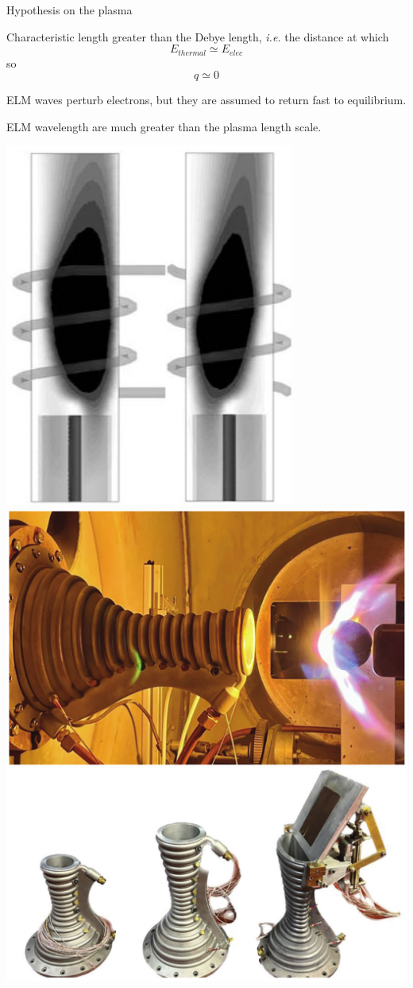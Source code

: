 \documentclass[24pt,t,table, aspectratio=169]{beamer}
\begin{document}
\begin{frame}{Hypothesis on the plasma}
\begin{minipage}{.39\linewidth}
{\begin{center}
\end{center}
}

{

Characteristic length greater than the Debye length, \textit{i.e.} the distance at which
\begin{equation*}
E_{thermal} \simeq E_{elec}
\end{equation*}
so
\begin{equation*}
q \simeq 0
\end{equation*}

}

{

	ELM waves perturb electrons, but they are assumed to return fast to equilibrium.
	
	ELM wavelength are much greater than the plasma length scale.

}

{

	
	\begin{center}
	\includegraphics[height=.4\linewidth]{./coil_effect.png}
	\includegraphics[height = .4\linewidth]{./plasmatron_nozzle_operating.png}
	\includegraphics[height = .4\linewidth]{./plasmatron_nozzles.png}
	\end{center}

}
\end{minipage}
\end{frame}
\end{document}
